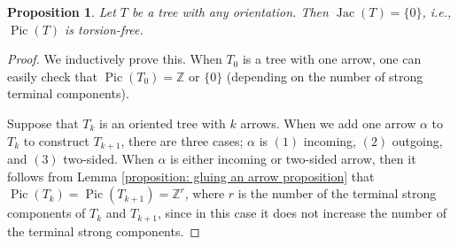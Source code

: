 \documentclass[11pt,reqno]{amsart}
\DeclareMathOperator{\Pic}{Pic}
\DeclareMathOperator{\Jac}{Jac}
\theoremstyle{definition}
\theoremstyle{plain}
\newtheorem{pro}[mydef]{Proposition}
\begin{document}
\begin{pro}\label{proposition: tree proposition}
Let $T$ be a tree with any orientation. Then $\Jac(T)=\{0\}$, i.e., $\Pic(T)$ is torsion-free.
\end{pro}
\begin{proof}
We inductively prove this. When $T_0$ is a tree with one arrow, one can easily check that $\Pic(T_0) =\mathbb{Z}$ or $\{0\}$ (depending on the number of strong terminal components).

Suppose that $T_k$ is an oriented tree with $k$ arrows. When we add one arrow $\alpha$ to $T_k$ to construct $T_{k+1}$, there are three cases; $\alpha$ is $(1)$ incoming, $(2)$ outgoing, and $(3)$ two-sided. When $\alpha$ is either incoming or two-sided arrow, then it follows from Lemma \ref{proposition: gluing an arrow proposition} that $\Pic(T_k)=\Pic(T_{k+1})=\mathbb{Z}^r$, where $r$ is the number of the terminal strong components of $T_k$ and $T_{k+1}$, since in this case it does not increase the number of the terminal strong components.


\end{proof}
\end{document}
